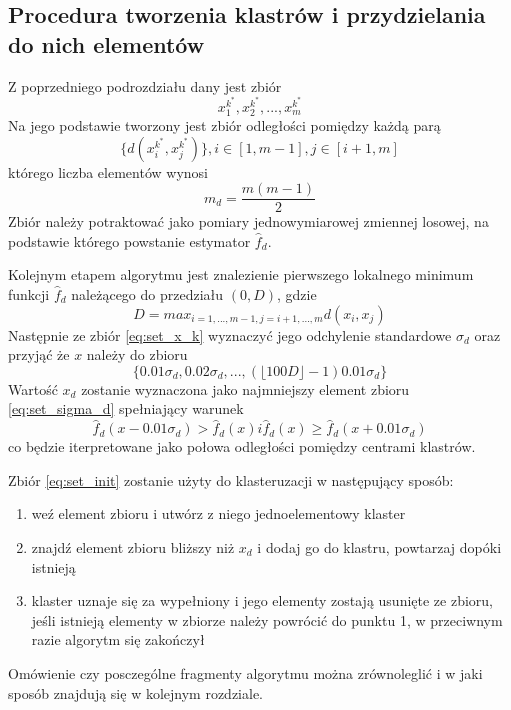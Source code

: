 \subsection{Procedura tworzenia klastrów i przydzielania do nich elementów}
\label{subsec:tworzenie_klastrow}
Z poprzedniego podrozdziału dany jest zbiór
\begin{equation} \label{eq:set_init}
x^{k^*}_1, x^{k^*}_2, ..., x^{k^*}_m 
\end{equation}
Na jego podstawie tworzony jest zbiór odległości pomiędzy każdą parą
\begin{equation} \label{eq:set_x_k}
\{ d(x^{k^*}_i, x^{k^*}_j) \}, i \in [1, m-1], j \in [i+1,m]
\end{equation}
którego liczba elementów wynosi
\begin{equation}
m_d=\frac{m(m-1)}{2}
\end{equation}
Zbiór należy potraktować jako pomiary jednowymiarowej zmiennej losowej, na podstawie którego powstanie estymator $\hat{f}_d$.

Kolejnym etapem algorytmu jest znalezienie pierwszego lokalnego minimum funkcji $\hat{f}_d$ należącego do przedziału $(0, D)$, gdzie
\begin{equation}
D = max_{i=1, ..., m-1, j=i+1, ..., m } d(x_i,x_j)
\end{equation}
Następnie ze zbiór \ref{eq:set_x_k} wyznaczyć jego odchylenie standardowe $\sigma_d$ oraz przyjąć że $x$ należy do zbioru
\begin{equation} \label{eq:set_sigma_d}
\{0.01 \sigma_d , 0.02 \sigma_d , ..., ( \lfloor 100D \rfloor -1) 0.01 \sigma_d \}
\end{equation}
Wartość $x_d$ zostanie wyznaczona jako najmniejszy element zbioru \ref{eq:set_sigma_d} spełniający warunek
\begin{equation}
\hat{f}_d(x-0.01\sigma_d) > \hat{f}_d(x) i \hat{f}_d(x) \geq \hat{f}_d(x+0.01\sigma_d) 
\end{equation}
co będzie iterpretowane jako połowa odległości pomiędzy centrami klastrów.


Zbiór \ref{eq:set_init} zostanie użyty do klasteruzacji w następujący sposób:
\begin{enumerate}
\item weź element zbioru i utwórz z niego jednoelementowy klaster
\item znajdź element zbioru bliższy niż $x_d$ i dodaj go do klastru, powtarzaj dopóki istnieją
\item klaster uznaje się za wypełniony i jego elementy zostają usunięte ze zbioru, jeśli istnieją elementy w zbiorze należy powrócić do punktu 1, w przeciwnym razie algorytm się zakończył
\end{enumerate}

Omówienie czy posczególne fragmenty algorytmu można zrównoleglić i w jaki sposób znajdują się w kolejnym rozdziale.